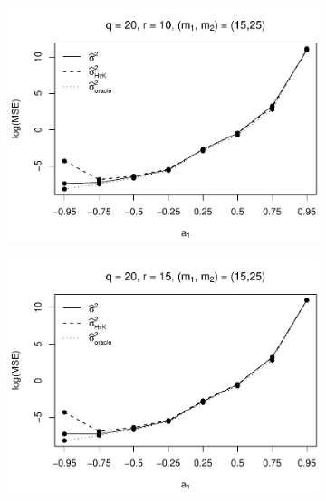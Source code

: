 \begin{figure}[p]
\begin{subfigure}[b]{0.45\textwidth}
\includegraphics[width=\textwidth]{Plots/Robustness/MSE_lrv_T=500_slope=1_(q,K1,K2,M1,M2)=(20,2,10,15,25).pdf}
\end{subfigure}
\hspace{0.25cm}
\begin{subfigure}[b]{0.45\textwidth}
\includegraphics[width=\textwidth]{Plots/Robustness/MSE_lrv_T=500_slope=1_(q,K1,K2,M1,M2)=(20,2,15,15,25).pdf}
\end{subfigure}


\end{figure}
